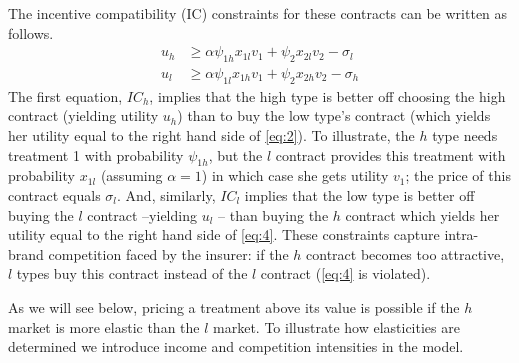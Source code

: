 \documentclass[a4paper,12pt]{article}
\begin{document}
The incentive compatibility (IC) constraints for these contracts can be written as follows.
\begin{align}
\label{eq:2}
u_h &\geq  \alpha \psi_{1h} x_{1l} v_1 + \psi_{2} x_{2l} v_2 - \sigma_{l} \\
\label{eq:4}
u_l &\geq   \alpha \psi_{1l} x_{1h} v_1 + \psi_{2} x_{2h} v_2 - \sigma_h
\end{align}
The first equation, \(IC_h\), implies that the high type is better off choosing the high contract (yielding utility \(u_h\)) than to buy the low type's contract (which yields her utility equal to the right hand side of \eqref{eq:2}). To illustrate, the \(h\) type needs treatment 1 with probability \(\psi_{1h}\), but the \(l\) contract provides this treatment with probability \(x_{1l}\) (assuming \(\alpha=1\)) in which case she gets utility \(v_{1}\); the price of this contract equals \(\sigma_{l}\). And, similarly, \(IC_l\) implies that the low type is better off buying the \(l\) contract --yielding \(u_l\) -- than buying the \(h\) contract which yields her utility equal to the right hand side of \eqref{eq:4}. These constraints capture intra-brand competition faced by the insurer: if the \(h\) contract becomes too attractive, \(l\) types buy this contract instead of the \(l\) contract (\eqref{eq:4} is violated).

As we will see below, pricing a treatment above its value is possible if the \(h\) market is more elastic than the \(l\) market. To illustrate how elasticities are determined we introduce income and competition intensities in the model.
\end{document}
